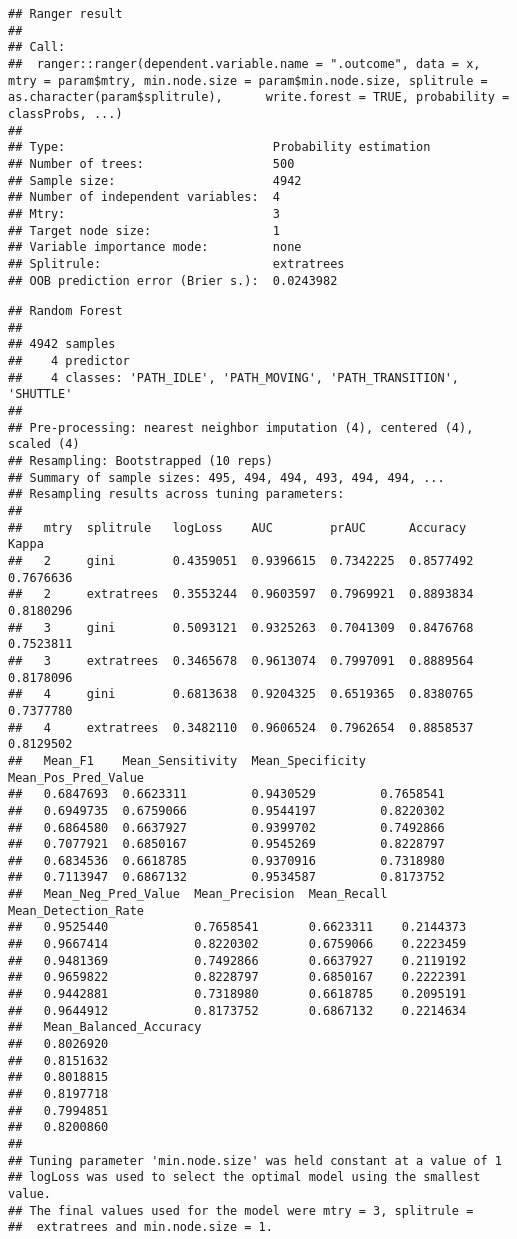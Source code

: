 \documentclass[]{article}
\begin{document}
\begin{verbatim}
## Ranger result
## 
## Call:
##  ranger::ranger(dependent.variable.name = ".outcome", data = x,      mtry = param$mtry, min.node.size = param$min.node.size, splitrule = as.character(param$splitrule),      write.forest = TRUE, probability = classProbs, ...) 
## 
## Type:                             Probability estimation 
## Number of trees:                  500 
## Sample size:                      4942 
## Number of independent variables:  4 
## Mtry:                             3 
## Target node size:                 1 
## Variable importance mode:         none 
## Splitrule:                        extratrees 
## OOB prediction error (Brier s.):  0.0243982
\end{verbatim}

\begin{verbatim}
## Random Forest 
## 
## 4942 samples
##    4 predictor
##    4 classes: 'PATH_IDLE', 'PATH_MOVING', 'PATH_TRANSITION', 'SHUTTLE' 
## 
## Pre-processing: nearest neighbor imputation (4), centered (4), scaled (4) 
## Resampling: Bootstrapped (10 reps) 
## Summary of sample sizes: 495, 494, 494, 493, 494, 494, ... 
## Resampling results across tuning parameters:
## 
##   mtry  splitrule   logLoss    AUC        prAUC      Accuracy   Kappa    
##   2     gini        0.4359051  0.9396615  0.7342225  0.8577492  0.7676636
##   2     extratrees  0.3553244  0.9603597  0.7969921  0.8893834  0.8180296
##   3     gini        0.5093121  0.9325263  0.7041309  0.8476768  0.7523811
##   3     extratrees  0.3465678  0.9613074  0.7997091  0.8889564  0.8178096
##   4     gini        0.6813638  0.9204325  0.6519365  0.8380765  0.7377780
##   4     extratrees  0.3482110  0.9606524  0.7962654  0.8858537  0.8129502
##   Mean_F1    Mean_Sensitivity  Mean_Specificity  Mean_Pos_Pred_Value
##   0.6847693  0.6623311         0.9430529         0.7658541          
##   0.6949735  0.6759066         0.9544197         0.8220302          
##   0.6864580  0.6637927         0.9399702         0.7492866          
##   0.7077921  0.6850167         0.9545269         0.8228797          
##   0.6834536  0.6618785         0.9370916         0.7318980          
##   0.7113947  0.6867132         0.9534587         0.8173752          
##   Mean_Neg_Pred_Value  Mean_Precision  Mean_Recall  Mean_Detection_Rate
##   0.9525440            0.7658541       0.6623311    0.2144373          
##   0.9667414            0.8220302       0.6759066    0.2223459          
##   0.9481369            0.7492866       0.6637927    0.2119192          
##   0.9659822            0.8228797       0.6850167    0.2222391          
##   0.9442881            0.7318980       0.6618785    0.2095191          
##   0.9644912            0.8173752       0.6867132    0.2214634          
##   Mean_Balanced_Accuracy
##   0.8026920             
##   0.8151632             
##   0.8018815             
##   0.8197718             
##   0.7994851             
##   0.8200860             
## 
## Tuning parameter 'min.node.size' was held constant at a value of 1
## logLoss was used to select the optimal model using the smallest value.
## The final values used for the model were mtry = 3, splitrule =
##  extratrees and min.node.size = 1.
\end{verbatim}
\end{document}
